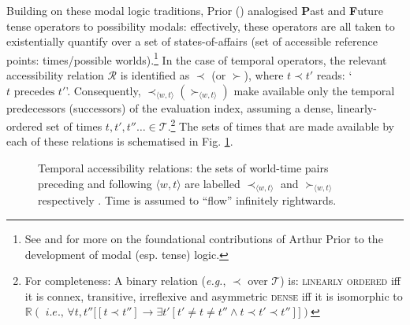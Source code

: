 \documentclass[12pt,dvipsnames]{report}
\begin{document}
\noindent Building on these modal logic traditions, Prior (\citeyear{Prior1958,Prior1967,Prior1957}) analogised \textbf{P}ast and \textbf{F}uture tense operators to possibility modals: effectively, these operators are all taken to existentially quantify over a set of states-of-affairs (set of accessible reference points: times/possible worlds).\footnote{See \citet{Copeland2002,Copeland2020} and \citet{Markoska-Cubrinovska2016} for more on the foundational contributions of Arthur Prior to the development of modal (esp. tense) logic.} In the case of temporal operators, the relevant accessibility relation $ \mathcal R $ is identified as $ \prec $ (or $ \succ $), where $ t\prec t' $ reads: `$ t \text{ precedes }t' $'. Consequently, $ \prec_{\langle w,t\rangle} (\succ_{\langle w,t\rangle}) $ make available only the temporal predecessors (successors) of the evaluation index, assuming a dense, linearly-ordered set of times $ t,t',t''\hdots\in\mathcal T $.\footnote{For completeness:
\pex[exno=,exnoformat=X] A binary relation (\textit{e.g.}, $ \prec $ over $ \mathcal T $) is:
\a  \textsc{linearly ordered} iff it is connex, transitive, irreflexive and asymmetric
\a \textsc{dense} iff it is isomorphic to $ \mathbb R (\textit{ i.e., } \forall t,t''\big[[t\prec t'']\to\exists t'[t'\neq t\neq t''\wedge t\prec t'\prec t'']\big] )$
\xe	
	
} 
The sets of times that are made available by each of these relations is schematised in Fig. \ref{temp-access}. 




\begin{figure}[h]\centering
	\caption{Temporal accessibility relations: the sets of world-time pairs preceding and following $ \langle w,t\rangle $  are labelled $ \prec_{\langle w,t\rangle} $ and  $ \succ_{\langle w,t\rangle} $ respectively \citep*[adapted from][93]{Kaufmann2006}. Time is assumed to ``flow'' infinitely rightwards.}\label{temp-access}
\end{figure}
\end{document}
